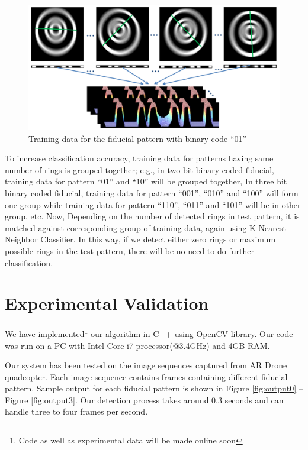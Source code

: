 \documentclass[runningheads]{llncs}
\begin{document}
\begin{figure}[h!]
\centering
  \includegraphics[width=\linewidth]{training_data.pdf}
  \caption{Training data for the fiducial pattern with binary code ``01''}
  \label{fig:training_data}
\end{figure}

To increase classification accuracy, training data for patterns having same
number of rings is grouped together; e.g., in two bit binary coded fiducial,
training data for pattern ``01'' and ``10'' will be grouped together, In three
bit binary coded fiducial, training data for pattern “001”, “010” and “100” will
form one group while training data for pattern “110”, “011” and “101” will be
in other group, etc. Now, Depending on the number of detected rings in test
pattern, it is matched against corresponding group of training data, again
using  K-Nearest Neighbor Classifier. In this way, if we detect either zero
rings or maximum possible rings in the test pattern, there will be no need to do
further classification.

\section{Experimental Validation}
We have implemented\footnote{Code as well as experimental data will be made
online soon} our algorithm in C++ using OpenCV library.
Our code was run on a PC with Intel Core i7 processor(@3.4GHz) and 4GB RAM.

Our system has been tested on the image sequences captured from AR Drone
quadcopter. Each image sequence contains frames containing different fiducial
pattern. Sample output for each fiducial pattern is shown in Figure
\ref{fig:output0} -- Figure \ref{fig:output3}. Our detection process takes
around 0.3 seconds and can handle three to four frames per second.
\end{document}
